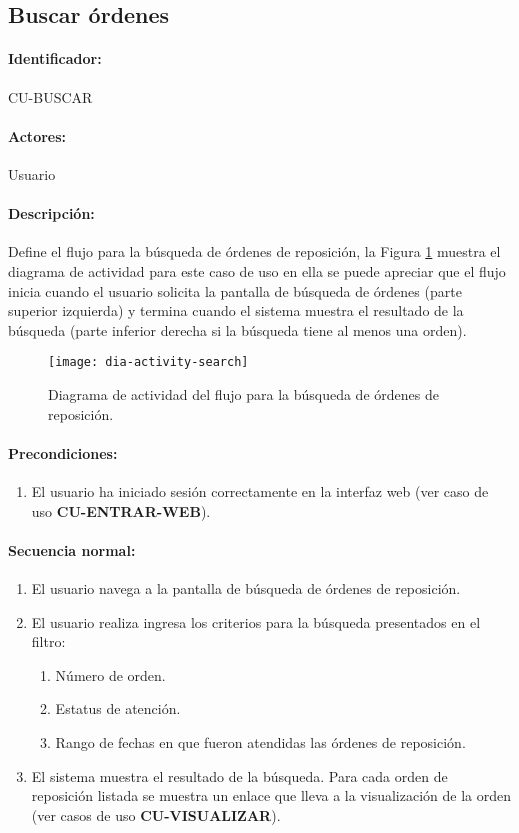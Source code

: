 \subsection{Buscar órdenes}\label{cu-buscar}
\paragraph{Identificador:}
CU-BUSCAR
\paragraph{Actores:}
Usuario
\paragraph{Descripción:}
Define el flujo para la búsqueda de órdenes de reposición, la Figura \ref{fig:dia-activity-search} muestra el diagrama de actividad para este caso de uso en ella se puede apreciar que el flujo inicia cuando el usuario solicita la pantalla de búsqueda de órdenes (parte superior izquierda) y termina cuando el sistema muestra el resultado de la búsqueda (parte inferior derecha si la búsqueda tiene al menos una orden).
\begin{figure}[h]
  \centering
  \texttt{[image: dia-activity-search]}
  \caption{Diagrama de actividad del flujo para la búsqueda de órdenes de reposición.}
  \label{fig:dia-activity-search}
\end{figure}
\paragraph{Precondiciones:}
\begin{enumerate}
  \item El usuario ha iniciado sesión correctamente en la interfaz web (ver caso de uso \textbf{CU-ENTRAR-WEB}).
\end{enumerate}
\paragraph{Secuencia normal:}
\begin{enumerate}
  \item El usuario navega a la pantalla de búsqueda de órdenes de reposición.
  \item El usuario realiza ingresa los criterios para la búsqueda presentados en el filtro:
  \begin{enumerate}
    \item Número de orden.
    \item Estatus de atención.
    \item Rango de fechas en que fueron atendidas las órdenes de reposición.
  \end{enumerate}
  \item El sistema muestra el resultado de la búsqueda. Para cada orden de reposición listada se muestra un enlace que lleva a la visualización de la orden (ver casos de uso \textbf{CU-VISUALIZAR}).
\end{enumerate}
